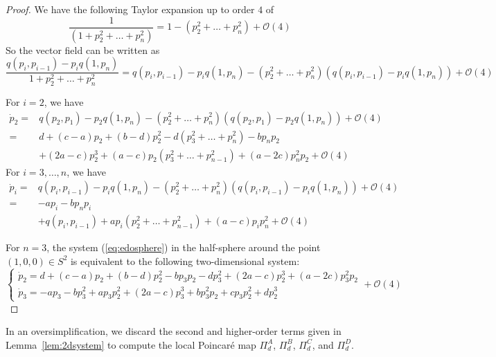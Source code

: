 \documentclass{article}
\theoremstyle{definition}
\begin{document}
\begin{proof}
We have the following Taylor expansion up to order $4$ of 
$$\dfrac{1}{(1+p_2^2+\dots + p_n^2)}=1-(p_2^2+\dots + p_n^2)+\mathcal{O}(4)$$
So the vector field can be written as 
$$\dfrac{q(p_i,p_{i-1})-p_i q(1,p_n)}{1+p_2^2+\dots +p_n^2}=q(p_i,p_{i-1})-p_i q(1,p_n)-(p_2^2+\dots +p_n^2)(q(p_i,p_{i-1})-p_i q(1,p_n))+\mathcal{O}(4)$$

For $i=2$, we have 
\begin{align*}
\dot{p}_2=&q(p_2,p_1)-p_2 q(1,p_n)-(p_2^2+\dots +p_n^2)(q(p_2,p_1)-p_2 q(1,p_n))+\mathcal{O}(4)\\
 =&d+(c-a)p_2+(b-d)p_2^2 -d(p_3^2+\dots +p_n^2) -b p_n p_2\\
 & +(2a-c) p_2^3 +(a-c) p_2(p_3^2+\dots +p_{n-1}^2) +(a-2c)p_n^2 p_2 +\mathcal{O}(4)
\end{align*}
For $i=3,\dots,n$, we have 
\begin{align*}
\dot{p}_i	=&q(p_i,p_{i-1})-p_i q(1,p_n)-(p_2^2+\dots +p_n^2)(q(p_i,p_{i-1})-p_i q(1,p_n))+\mathcal{O}(4)\\
					=& -ap_i -bp_np_i\\
					&+q(p_i,p_{i-1})+a p_i(p_2^2+\dots +p_{n-1}^2)+(a-c)p_i p_n^2 +\mathcal{O}(4) 
\end{align*}

For $n=3$, the system (\ref{eq:edosphere}) in the half-sphere around the point $(1,0,0)\in S^2$ is equivalent to the following two-dimensional system:
$$\begin{cases}
\dot{p}_2=d+(c-a)p_2+(b-d)p_2^2  -b p_3 p_2-d p_3^2+(2a-c) p_2^3 +(a-2c)p_3^2 p_2 \\
\dot{p}_3	= -a p_3- bp_3^2+a p_3 p_2^2+(2a-c)p_3^3+bp_3^2p_2+cp_3p_2^2+dp_2^3 
\end{cases}+\mathcal{O}(4)
$$


\end{proof}

In an oversimplification, we discard the second and higher-order terms given in  Lemma~\ref{lem:2dsystem} to compute the local Poincaré map $\Pi^A_d$, $\Pi^B_d$, $\Pi^C_d$, and $\Pi^D_d$.
\end{document}
